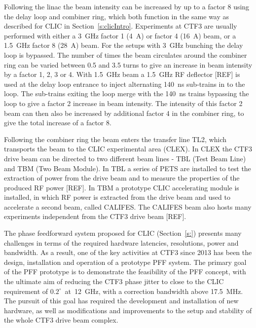 Following the linac the beam intensity can be increased by up to a factor 8 using the delay loop and combiner ring, which both function in the same way as described for CLIC in Section~\ref{s:clicIntro}. Experiments at CTF3 are usually performed with either a 3~GHz factor 1 (4~A) or factor 4 (16~A) beam, or a 1.5~GHz factor 8 (28~A) beam. For the setups with 3~GHz bunching the delay loop is bypassed. The number of times the beam circulates around the combiner ring can be varied between 0.5 and 3.5 turns to give an increase in beam intensity by a factor 1, 2, 3 or 4. With 1.5~GHz beam a 1.5~GHz RF deflector [REF] is used at the delay loop entrance to inject alternating 140~ns sub-trains in to the loop. The sub-trains exiting the loop merge with the 140~ns trains bypassing the loop to give a factor 2 increase in beam intensity. The intensity of this factor 2 beam can then also be increased by additional factor 4 in the combiner ring, to give the total increase of a factor 8.

Following the combiner ring the beam enters the transfer line TL2, which transports the beam to the CLIC experimental area (CLEX). In CLEX the CTF3 drive beam can be directed to two different beam lines - TBL (Test Beam Line) and TBM (Two Beam Module). In TBL a series of PETS are installed to test the extraction of power from the drive beam and to measure the properties of the produced RF power [REF]. In TBM a prototype CLIC accelerating module is installed, in which RF power is extracted from the drive beam and used to accelerate a second beam, called CALIFES. The CALIFES beam also hosts many experiments independent from the CTF3 drive beam [REF].


The phase feedforward system proposed for CLIC (Section~\ref{s:}) presents many challenges in terms of the required hardware latencies, resolutions, power and bandwidth. As a result, one of the key activities at CTF3 since 2013 has been the design, installation and operation of a prototype PFF system. The primary goal of the PFF prototype is to demonstrate the feasibility of the PFF concept, with the ultimate aim of reducing the CTF3 phase jitter to close to the CLIC requirement of \(0.2^\circ\)~at~12~GHz, with a correction bandwidth above 17.5~MHz. The pursuit of this goal has required the development and installation of new hardware, as well as modifications and improvements to the setup and stability of the whole CTF3 drive beam complex.

